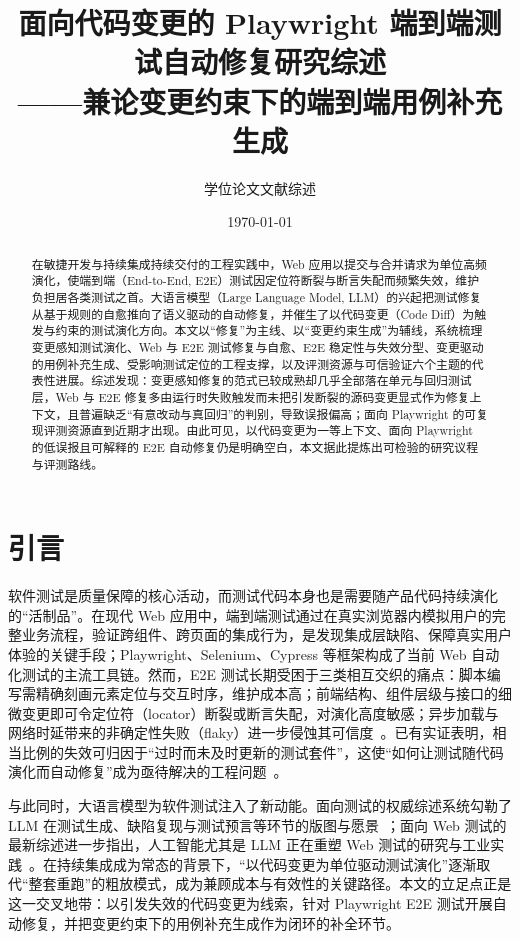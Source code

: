 \documentclass[11pt,a4paper]{article}
\title{面向代码变更的 Playwright 端到端测试自动修复研究综述\\
\large ——兼论变更约束下的端到端用例补充生成}
\author{学位论文文献综述}
\date{\today}
\begin{document}
\maketitle
\setcounter{secnumdepth}{3}

\begin{abstract}
在敏捷开发与持续集成持续交付的工程实践中，Web 应用以提交与合并请求为单位高频演化，使端到端（End-to-End, E2E）测试因定位符断裂与断言失配而频繁失效，维护负担居各类测试之首。大语言模型（Large Language Model, LLM）的兴起把测试修复从基于规则的自愈推向了语义驱动的自动修复，并催生了以代码变更（Code Diff）为触发与约束的测试演化方向。本文以“修复”为主线、以“变更约束生成”为辅线，系统梳理变更感知测试演化、Web 与 E2E 测试修复与自愈、E2E 稳定性与失效分型、变更驱动的用例补充生成、受影响测试定位的工程支撑，以及评测资源与可信验证六个主题的代表性进展。综述发现：变更感知修复的范式已较成熟却几乎全部落在单元与回归测试层，Web 与 E2E 修复多由运行时失败触发而未把引发断裂的源码变更显式作为修复上下文，且普遍缺乏“有意改动与真回归”的判别，导致误报偏高；面向 Playwright 的可复现评测资源直到近期才出现。由此可见，以代码变更为一等上下文、面向 Playwright 的低误报且可解释的 E2E 自动修复仍是明确空白，本文据此提炼出可检验的研究议程与评测路线。
\end{abstract}

\section{引言}

软件测试是质量保障的核心活动，而测试代码本身也是需要随产品代码持续演化的“活制品”。在现代 Web 应用中，端到端测试通过在真实浏览器内模拟用户的完整业务流程，验证跨组件、跨页面的集成行为，是发现集成层缺陷、保障真实用户体验的关键手段；Playwright、Selenium、Cypress 等框架构成了当前 Web 自动化测试的主流工具链。然而，E2E 测试长期受困于三类相互交织的痛点：脚本编写需精确刻画元素定位与交互时序，维护成本高；前端结构、组件层级与接口的细微变更即可令定位符（locator）断裂或断言失配，对演化高度敏感；异步加载与网络时延带来的非确定性失败（flaky）进一步侵蚀其可信度~\cite{seleniumchallenges,webtestingsurvey}。已有实证表明，相当比例的失效可归因于“过时而未及时更新的测试套件”，这使“如何让测试随代码演化而自动修复”成为亟待解决的工程问题~\cite{utfix}。

与此同时，大语言模型为软件测试注入了新动能。面向测试的权威综述系统勾勒了 LLM 在测试生成、缺陷复现与测试预言等环节的版图与愿景~\cite{llmtestingsurvey}；面向 Web 测试的最新综述进一步指出，人工智能尤其是 LLM 正在重塑 Web 测试的研究与工业实践~\cite{webtestingsurvey}。在持续集成成为常态的背景下，“以代码变更为单位驱动测试演化”逐渐取代“整套重跑”的粗放模式，成为兼顾成本与有效性的关键路径。本文的立足点正是这一交叉地带：以引发失效的代码变更为线索，针对 Playwright E2E 测试开展自动修复，并把变更约束下的用例补充生成作为闭环的补全环节。
\end{document}
